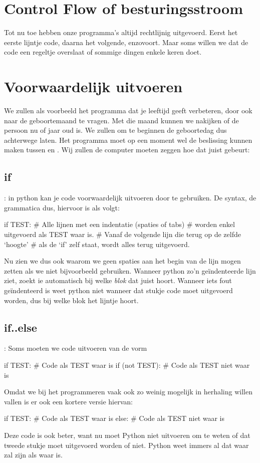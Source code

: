 
\section*{Control Flow of besturingsstroom}
  Tot nu toe hebben onze programma's altijd rechtlijnig uitgevoerd. Eerst het
  eerste lijntje code, daarna het volgende, enzovoort. Maar soms willen we dat
  de code een regeltje overslaat of sommige dingen enkele keren doet.
  \section{Voorwaardelijk uitvoeren}
  We zullen als voorbeeld het programma dat je leeftijd geeft verbeteren, door
  ook naar de geboortemaand te vragen. Met die maand kunnen we nakijken of de
  persoon nu  of  jaar oud is. We zullen om te
  beginnen de geboortedag dus achterwege laten. Het programma moet op een moment
  wel de beslissing kunnen maken tussen  en . Wij
  zullen de computer moeten zeggen hoe dat juist gebeurt:
  \subsection{if}: in python kan je code voorwaardelijk uitvoeren door 
  te gebruiken. De syntax, de grammatica dus, hiervoor is als volgt:
  \begin{python}
    if TEST:
      # Alle lijnen met een indentatie (spaties of tabs)
      # worden enkel uitgevoerd als TEST waar is.
    # Vanaf de volgende lijn die terug op de zelfde `hoogte'
    # als de `if' zelf staat, wordt alles terug uitgevoerd.
  \end{python}
  Nu zien we dus ook waarom we geen spaties aan het begin van de lijn mogen
  zetten als we niet bijvoorbeeld  gebruiken. Wanneer python zo'n
  ge\"indenteerde lijn ziet, zoekt ie automatisch bij welke \emph{blok} dat
  juist hoort. Wanneer iets fout ge\"indenteerd is weet python niet wanneer dat
  stukje code moet uitgevoerd worden, dus bij welke blok het lijntje hoort.

  \subsection{if..else}: Soms moeten we code uitvoeren van de vorm
  \begin{python}
    if TEST:
      # Code als TEST waar is
    if (not TEST):
      # Code als TEST niet waar is
  \end{python}
  Omdat we bij het programmeren vaak ook zo weinig mogelijk in herhaling willen
  vallen is er ook een kortere versie hiervan:
  \begin{python}
    if TEST:
      # Code als TEST waar is
    else:
      # Code als TEST niet waar is
  \end{python}
  Deze code is ook beter, want nu moet Python niet  uitvoeren
  om te weten of dat tweede stukje moet uitgevoerd worden of niet. Python weet
  immers al dat  waar zal zijn als  waar is.

